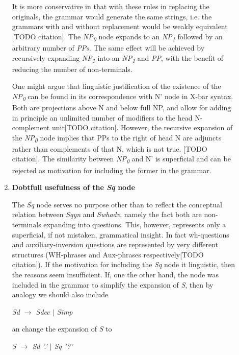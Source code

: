 \documentclass{article}
\begin{document}
\begin{description}
\begin{enumerate}
\begin{center}
			
		\end{center}
		
		It is more conservative in that with these rules in replacing the originals, the grammar would generate the same strings, i.e. the grammars with and without replacement would be weakly equivalent [TODO citation].
		The \emph{NP\textsubscript{0}} node expands to an \emph{NP\textsubscript{1}} followed by an arbitrary number of \emph{PPs}. The same effect will be achieved by recursively expanding \emph{NP\textsubscript{1}}  into an \emph{NP\textsubscript{1}} and  \emph{PP}, with the benefit of reducing the number of non-terminals.
		
		One might argue that linguistic justification of the existence of the \emph{NP\textsubscript{0}} can be found in its correspondence with N' node in X-bar syntax. Both are projections above N and below full NP, and allow for adding in principle an unlimited number of modifiers to the head N-complement unit[TODO citation]. However, the recursive expansion of the \emph{NP\textsubscript{0}} node implies that PPs to the right of head N are adjuncts rather than complements of that N, which is not true. [TODO citation]. The similarity between \emph{NP\textsubscript{0}} and N' is superficial and can be rejected as motivation for including the former in the grammar. 
		
		\item
		\textbf{Dobtfull usefulness of the \textit{Sq} node}
		
		The \emph{Sq} node serves no purpose other than to reflect the conceptual relation between \emph{Sqyn} and \emph{Swhadv}, namely the fact both are non-terminals expanding into questions. This, however, represents only a superficial, if not mistaken, grammatical insight. In fact wh-questions and auxiliary-inversion questions are represented by very different structures (WH-phrases and Aux-phrases respectively[TODO citation]). If the motivation for including the \emph{Sq} node it linguistic, then the reasons seem insufficient.
		If, one the other hand, the node was included in the grammar to simplify the expansion of \emph{S}, then by analogy we should also include
		\begin{center}
			
			\emph{Sd $\rightarrow$ Sdec $\vert$ Simp}
			
		\end{center}an change the expansion of \emph{S} to
		\begin{center}
			
			\emph{S $\rightarrow$ Sd '.' $\vert$ Sq '?'}
			

\end{center}
\end{enumerate}
\end{description}
\end{document}
